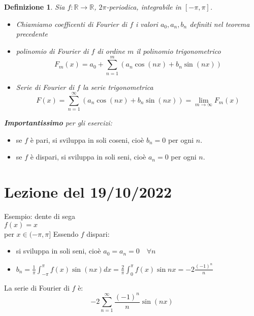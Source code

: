 \documentclass{scrreprt}
\newtheorem{defn}{Definizione}
\newenvironment{definition}{\begin{mdframed}[backgroundcolor=Ivory2]\begin{defn}}{\end{defn}\end{mdframed}}
\begin{document}
\begin{definition}
	Sia $f:\mathbb{R}\to\mathbb{R}$, $2\pi$-periodica, integrabile in $\left[-\pi,\pi\right]$.
	\begin{itemize}
		\item Chiamiamo coefficenti di Fourier di $f$ i valori $a_0, a_n, b_n$ definiti nel teorema precedente
		\item polinomio di Fourier di $f$ di ordine $m$ il polinomio trigonometrico
			\begin{equation}
				F_m(x) = a_0 + \sum_{n=1}^m \left(a_n \cos(nx) + b_n \sin(nx)\right)
			\end{equation}
		\item Serie di Fourier di $f$ la serie trigonometrica
			\begin{equation}
				F(x) = \sum_{n=1}^\infty \left(a_n \cos(nx) + b_n \sin(nx)\right) = \lim_{m\to\infty} F_m(x)
			\end{equation}
	\end{itemize}
\end{definition}

\emph{\textbf{Importantissimo} per gli esercizi:}
\begin{itemize}
	\item se $f$ è pari, si sviluppa in soli coseni, cioè $b_n=0$ per ogni $n$.
	\item se $f$ è dispari, si sviluppa in soli seni, cioè $a_n=0$ per ogni $n$.
\end{itemize}

\section*{Lezione del 19/10/2022}

Esempio: dente di sega\\
$f(x) = x$\\
per $x \in (-\pi,\pi]$
Essendo $f$ dispari:
\begin{itemize}
	\item si sviluppa in soli seni, cioè $a_0=a_n=0 \quad \forall n$
	\item $b_n = \frac{1}{\pi} \int_{-\pi}^\pi f(x) \sin(nx)dx = \frac{2}{\pi} \int_{0}^\pi f(x) \sin{nx} = -2\frac{(-1)^n}{n}$
\end{itemize}
La serie di Fourier di $f$ è:
\begin{equation}
	-2\sum_{n=1}^\infty \frac{(-1)^n}{n} \sin(nx)
\end{equation}
\end{document}
